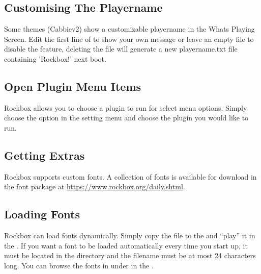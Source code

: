 \subsection{\label{ref:CustomisingThePlayername}Customising The Playername}

Some themes (Cabbiev2) show a customizable playername in the Whats Playing Screen.
Edit the first line of  to show your own message
or leave an empty file to disable the feature, deleting the file will generate a new
playername.txt file containing 'Rockbox!' next boot.

\subsection{\label{ref:OpenPlugins}Open Plugin Menu Items}

Rockbox allows you to choose a plugin to run for select menu options.
Simply choose the option in the setting menu and choose the plugin
you would like to run.

\subsection{\label{ref:GettingExtras}Getting Extras}

Rockbox supports custom fonts. A collection of fonts is available for download
in the font package at \url{https://www.rockbox.org/daily.shtml}.

\subsection{\label{ref:Loadingfonts}Loading Fonts}
Rockbox can load fonts dynamically. Simply copy the  file to the
\dap{} and ``play'' it in the . If you want a font to
be loaded automatically every time you start up, it must be located in the
 directory and the filename must be at most 24 characters
long. You can browse the fonts in  under
in the .\\



